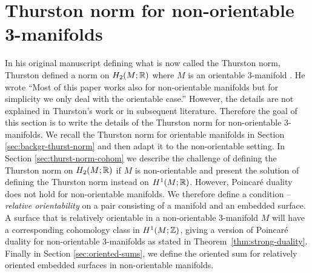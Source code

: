 \section{Thurston norm for non-orientable 3-manifolds}
\label{sec:thur-norm-non-orientable}
In his original manuscript defining what is now called the Thurston norm, Thurston defined a norm on $H_2(M;\mathbb{R})$ where $M$ is an orientable 3-manifold \cite{thurston1986norm}.  He wrote ``Most of this paper works also for non-orientable manifolds but for simplicity we only deal with the orientable case.''  However, the details are not explained in Thurston's work or in subsequent literature.  Therefore the goal of this section is to write the details of the Thurston norm for non-orientable 3-manifolds.
We recall the Thurston norm for orientable manifolds in Section \ref{sec:backgr-thurst-norm} and then adapt it to the non-orientable setting.
In Section \ref{sec:thurst-norm-cohom} we describe the challenge of defining the Thurston norm on $H_2(M;\mathbb{R})$ if $M$ is non-orientable and present the solution of defining the Thurston norm instead on $H^1(M;\mathbb{R})$.
However, Poincar\'e duality does not hold for non-orientable manifolds.
We therefore define a condition -- {\it relative orientability} on a pair consisting of a manifold and an embedded surface.
A surface that is relatively orientable in a non-orientable 3-manifold $M$ will have a corresponding cohomology class in $H^1(M;\mathbb{Z})$, giving a version of Poincar\'e duality for non-orientable 3-manifolds as stated in Theorem~\ref{thm:strong-duality}.
Finally in Section \ref{sec:oriented-sums}, we define the oriented sum for relatively oriented embedded surfaces in non-orientable manifolds.



